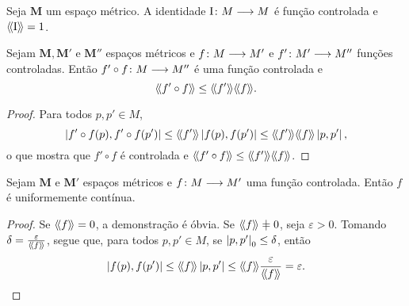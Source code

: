 %

\begin{exercise}
Seja $\bm M$ um espaço métrico. A identidade $\mathrm{I}\colon \allowbreak M \longrightarrow M$ é função controlada e $\langle\!\langle{\mathrm{I}}\rangle\!\rangle=1$.
\end{exercise}

\begin{proposition}
\label{prop:composicao.controlada}
Sejam $\bm M, \bm M'$ e $\bm M''$ espaços métricos e $f\colon \allowbreak M \longrightarrow M'$ e $f'\colon \allowbreak M' \longrightarrow M''$ funções controladas. Então $f' \circ f\colon \allowbreak M \longrightarrow M''$ é uma função controlada e
	\begin{equation*}
		\langle\!\langle{f' \circ f}\rangle\!\rangle \leq \langle\!\langle{f'}\rangle\!\rangle\langle\!\langle{f}\rangle\!\rangle.
	\end{equation*}
\end{proposition}
\begin{proof}
Para todos $p,p' \in M$,
	\begin{equation*}
	\left\vert{f' \circ f(p)},{f' \circ f(p')}\right\vert \leq \langle\!\langle{f'}\rangle\!\rangle \left\vert{f(p)},{f(p')}\right\vert \leq \langle\!\langle{f'}\rangle\!\rangle\langle\!\langle{f}\rangle\!\rangle\left\vert{p},{p'}\right\vert,
	\end{equation*}
o que mostra que $f' \circ f$ é controlada e $\langle\!\langle{f' \circ f}\rangle\!\rangle \leq \langle\!\langle{f'}\rangle\!\rangle\langle\!\langle{f}\rangle\!\rangle$.
\end{proof}

\begin{proposition}
\label{prop:continuidade.controlada}
Sejam $\bm M$ e $\bm M'$ espaços métricos e $f\colon \allowbreak M \longrightarrow M'$ uma função controlada. Então $f$ é uniformemente contínua.
\end{proposition}
\begin{proof}
Se $\langle\!\langle{f}\rangle\!\rangle=0$, a demonstração é óbvia. Se $\distor{f} \neq 0$, seja $\varepsilon>0$. Tomando $\delta=\frac{\varepsilon}{\langle\!\langle{f}\rangle\!\rangle}$, segue que, para todos $p,p' \in M$, se $\left\vert{p},{p'}\right\vert_0 \leq \delta$, então
	\begin{equation*}
	\left\vert{f(p)},{f(p')}\right\vert \leq \langle\!\langle{f}\rangle\!\rangle\left\vert{p},{p'}\right\vert \leq \langle\!\langle{f}\rangle\!\rangle\frac{\varepsilon}{\langle\!\langle{f}\rangle\!\rangle} = \varepsilon.
	\qedhere
	\end{equation*}
\end{proof}

